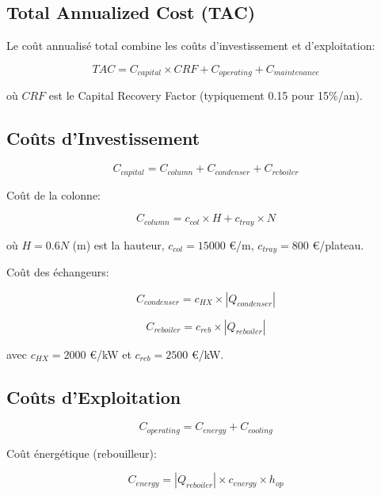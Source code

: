 \documentclass[11pt,a4paper]{article}
\begin{document}
\subsection{Total Annualized Cost (TAC)}

Le coût annualisé total combine les coûts d'investissement et d'exploitation:

\begin{equation}
TAC = C_{capital} \times CRF + C_{operating} + C_{maintenance}
\end{equation}

où $CRF$ est le Capital Recovery Factor (typiquement 0.15 pour 15\%/an).

\subsection{Coûts d'Investissement}

\begin{equation}
C_{capital} = C_{column} + C_{condenser} + C_{reboiler}
\end{equation}

Coût de la colonne:

\begin{equation}
C_{column} = c_{col} \times H + c_{tray} \times N
\end{equation}

où $H = 0.6N$ (m) est la hauteur, $c_{col} = 15000$ €/m, $c_{tray} = 800$ €/plateau.

Coût des échangeurs:

\begin{equation}
C_{condenser} = c_{HX} \times |Q_{condenser}|
\end{equation}

\begin{equation}
C_{reboiler} = c_{reb} \times |Q_{reboiler}|
\end{equation}

avec $c_{HX} = 2000$ €/kW et $c_{reb} = 2500$ €/kW.

\subsection{Coûts d'Exploitation}

\begin{equation}
C_{operating} = C_{energy} + C_{cooling}
\end{equation}

Coût énergétique (rebouilleur):

\begin{equation}
C_{energy} = |Q_{reboiler}| \times c_{energy} \times h_{op}
\end{equation}
\end{document}
